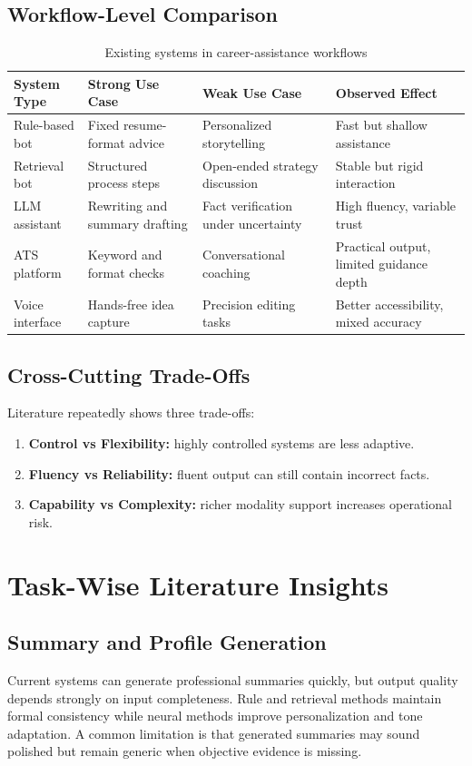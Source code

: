 \documentclass[conference]{IEEEtran}
\begin{document}
\subsection{Workflow-Level Comparison}
\begin{table}[ht]
\centering
\caption{Existing systems in career-assistance workflows}
\begin{tabular}{|p{3.0cm}|p{3.5cm}|p{3.8cm}|p{3.6cm}|}
\hline
\textbf{System Type} & \textbf{Strong Use Case} & \textbf{Weak Use Case} & \textbf{Observed Effect} \\
\hline
Rule-based bot & Fixed resume-format advice & Personalized storytelling & Fast but shallow assistance \\
\hline
Retrieval bot & Structured process steps & Open-ended strategy discussion & Stable but rigid interaction \\
\hline
LLM assistant & Rewriting and summary drafting & Fact verification under uncertainty & High fluency, variable trust \\
\hline
ATS platform & Keyword and format checks & Conversational coaching & Practical output, limited guidance depth \\
\hline
Voice interface & Hands-free idea capture & Precision editing tasks & Better accessibility, mixed accuracy \\
\hline
\end{tabular}
\end{table}

\subsection{Cross-Cutting Trade-Offs}
Literature repeatedly shows three trade-offs:
\begin{enumerate}
    \item \textbf{Control vs Flexibility:} highly controlled systems are less adaptive.
    \item \textbf{Fluency vs Reliability:} fluent output can still contain incorrect facts.
    \item \textbf{Capability vs Complexity:} richer modality support increases operational risk.
\end{enumerate}

\section{Task-Wise Literature Insights}
\subsection{Summary and Profile Generation}
Current systems can generate professional summaries quickly, but output quality depends strongly on input completeness. Rule and retrieval methods maintain formal consistency while neural methods improve personalization and tone adaptation. A common limitation is that generated summaries may sound polished but remain generic when objective evidence is missing.
\end{document}
